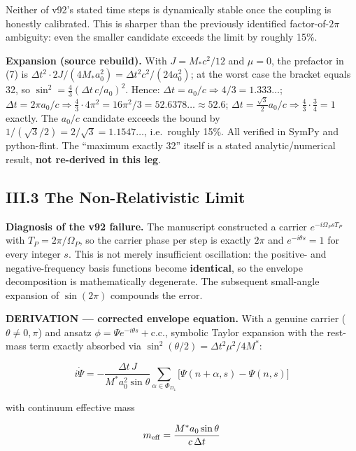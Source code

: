 \documentclass[a4paper,11pt]{article}
\newcommand{\expansion}[1]{\par\smallskip\noindent\textbf{Expansion (source rebuild).} #1\par\smallskip}
\begin{document}
Neither of v92's stated time steps is dynamically stable once the coupling is honestly calibrated. This is sharper than the previously identified factor-of-$2\pi$ ambiguity: even the smaller candidate exceeds the limit by roughly 15\%.


\expansion{With $J = M_*c^2/12$ and $\mu = 0$, the prefactor in (7) is $\Delta t^2\cdot 2J/(4M_*a_0^2) = \Delta t^2c^2/(24a_0^2)$; at the worst case the bracket equals 32, so $\sin^2 = \tfrac{4}{3}(\Delta t\,c/a_0)^2$. Hence: $\Delta t = a_0/c \Rightarrow 4/3 = 1.333\ldots$; $\Delta t = 2\pi a_0/c \Rightarrow \tfrac{4}{3}\cdot 4\pi^2 = 16\pi^2/3 = 52.6378\ldots \approx 52.6$; $\Delta t = \tfrac{\sqrt{3}}{2}a_0/c \Rightarrow \tfrac{4}{3}\cdot\tfrac{3}{4} = 1$ exactly. The $a_0/c$ candidate exceeds the bound by $1/(\sqrt{3}/2) = 2/\sqrt{3} = 1.1547\ldots$, i.e.\ roughly 15\%. All verified in SymPy and python-flint. The ``maximum exactly 32'' itself is a stated analytic/numerical result, \textbf{not re-derived in this leg}.}
\subsection*{III.3 The Non-Relativistic Limit}

\textbf{Diagnosis of the v92 failure.} The manuscript constructed a carrier $e^{-i\Omega_PsT_P}$ with $T_P=2\pi/\Omega_P$, so the carrier phase per step is exactly $2\pi$ and $e^{-i\theta s}=1$ for every integer $s$. This is not merely insufficient oscillation: the positive- and negative-frequency basis functions become \textbf{identical}, so the envelope decomposition is mathematically degenerate. The subsequent small-angle expansion of $\sin(2\pi)$ compounds the error.

\textbf{DERIVATION — corrected envelope equation.} With a genuine carrier ($\theta\ne0,\pi$) and ansatz $\phi=\Psi e^{-i\theta s}+\text{c.c.}$, symbolic Taylor expansion with the rest-mass term exactly absorbed via $\sin^2(\theta/2)=\Delta t^2\mu^2/4M^{*}$:

\[\boxed{\;i\dot\Psi=-\frac{\Delta t\,J}{M^{*}a_0^2\sin\theta}\sum_{\alpha\in\Phi_{D_4}}\big[\Psi(n{+}\alpha,s)-\Psi(n,s)\big]\;}\]

with continuum effective mass

\[m_{\rm eff}=\frac{M^{*}a_0\sin\theta}{c\,\Delta t}\]
\end{document}
